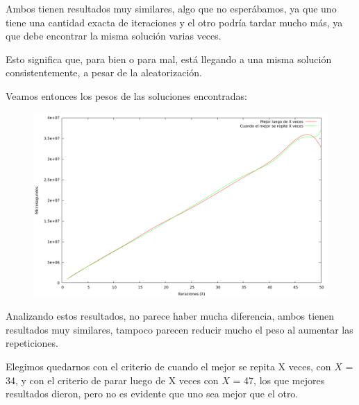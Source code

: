 \vspace*{0.5cm}

Ambos tienen resultados muy similares, algo que no esperábamos, ya que uno tiene
una cantidad exacta de iteraciones y el otro podría tardar mucho más, ya que
debe encontrar la misma solución varias veces.

Esto significa que, para bien o para mal, está llegando a una misma solución
consistentemente, a pesar de la aleatorización.

Veamos entonces los pesos de las soluciones encontradas:

\vspace*{0.5cm}

\begin{figure}[h]
  \begin{center}
    \includegraphics[scale=0.35]{imagenes/grasp-criterio-tiempo.png}
  \end{center}
\end{figure}

\vspace*{0.5cm}

Analizando estos resultados, no parece haber mucha diferencia, ambos tienen
resultados muy similares, tampoco parecen reducir mucho el peso al
aumentar las repeticiones.

Elegimos quedarnos con el criterio de cuando el mejor se repita X veces, con
$X$ = 34, y con el criterio de parar luego de X veces con $X$ = 47, los que
mejores resultados dieron, pero no es evidente que uno sea mejor que el otro.
